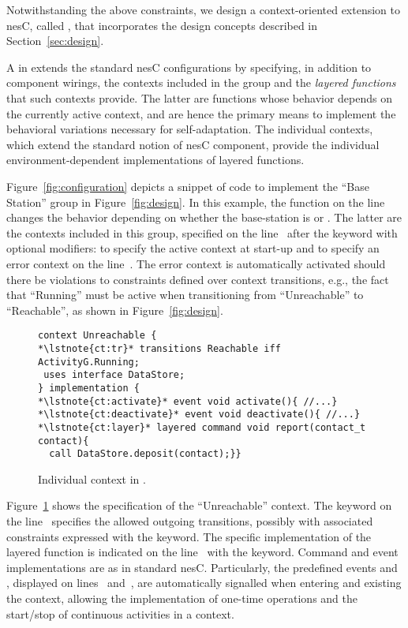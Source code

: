 \fakepar{\conesc} Notwithstanding the above constraints, we design a
context-oriented extension to nesC, called \conesc, that incorporates
the design concepts described in Section~\ref{sec:design}.

A  in \conesc extends the standard nesC
configurations by specifying, in addition to component wirings, the
contexts included in the group and the \emph{layered
  functions}~\cite{cop} that such contexts provide. The latter are
functions whose behavior depends on the currently active context, and
are hence the primary means to implement the behavioral variations
necessary for self-adaptation. The individual contexts, which extend
the standard notion of nesC component, provide the individual
environment-dependent implementations of layered functions.

Figure~\ref{fig:configuration} depicts a snippet of \conesc code to
implement the ``Base Station'' group in Figure~\ref{fig:design}. In
this example, the  function on the line~
changes the behavior depending on whether the base-station is
 or . The latter are the contexts
included in this group, specified on the line~ after the keyword
 with optional modifiers:  to specify the active
context at start-up and  to specify an error context on the
line~. The error context is automatically activated should
there be violations to constraints defined over context transitions, e.g., the
fact that ``Running'' must be active when transitioning from
``Unreachable'' to ``Reachable'', as shown in Figure~\ref{fig:design}.

\begin{figure}[!tb]
\begin{lstlisting}[style=conescframe]
context Unreachable {
*\lstnote{ct:tr}* transitions Reachable iff ActivityG.Running;
 uses interface DataStore;
} implementation {
*\lstnote{ct:activate}* event void activate(){ //...}
*\lstnote{ct:deactivate}* event void deactivate(){ //...}
*\lstnote{ct:layer}* layered command void report(contact_t contact){
  call DataStore.deposit(contact);}}
\end{lstlisting}
\vspace{-4mm}
\caption{Individual context in \conesc.}
  \label{fig:context}
\vspace{-2mm}
\end{figure}

Figure~\ref{fig:context} shows the \conesc specification of the
``Unreachable'' context. The keyword 
on the line~ specifies the allowed outgoing transitions,
possibly with associated constraints expressed with the 
keyword. The specific implementation of the layered function is
indicated on the line~ with the  keyword.
Command and event implementations are as in
standard nesC. Particularly, the predefined events 
and , displayed on lines~
and~, are automatically signalled when entering and
existing the context, allowing the implementation of one-time operations and the
start/stop of continuous activities in a context.

